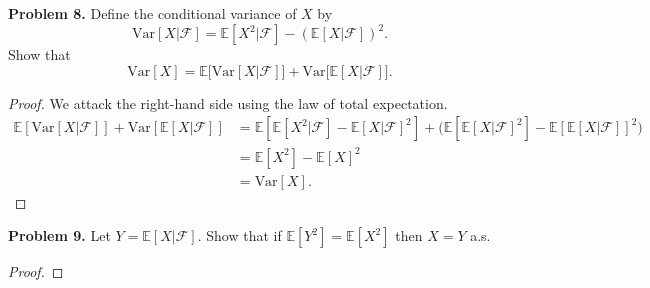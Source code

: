 \documentclass[11pt,letterpaper]{report}
\newcommand{\mcal}[1]{\mathcal{#1}}
\newcommand{\E}{\mathbb{E}}
\newcommand{\Var}{\text{Var}}
\begin{document}
\noindent\textbf{Problem 8. }
Define the conditional variance of $X$ by
\[
\Var[X|\mcal{F}] = \E[X^2|\mcal{F}] - (\E[X|\mcal{F}])^2.
\]
Show that
\[
\Var[X] = \E\big[ \Var[X|\mcal{F}]\big] + \Var\big[ \E[X|\mcal{F}]\big].
\]
\begin{proof}
	We attack the right-hand side using the law of total expectation.
	\begin{align*}
		\E[\Var[X|\mcal{F}]] + \Var[\E[X|\mcal{F}]] &= \E[\E[X^2|\mcal{F}] - \E[X|\mcal{F}]^2] + \bigg( \E[\E[X|\mcal{F}]^2] - \E[\E[X|\mcal{F}]]^2\bigg)\\
		&= \E[X^2] - \E[X]^2\\
		&= \Var[X].
	\end{align*}
\end{proof}

\noindent\textbf{Problem 9. }
Let $Y = \E[X|\mcal{F}]$. Show that if $\E[Y^2] = \E[X^2]$ then $X = Y$ a.s.
\begin{proof}
	
\end{proof}
\end{document}
